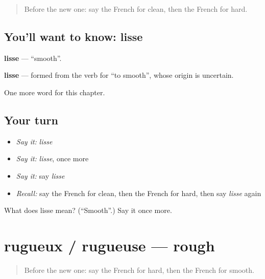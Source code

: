 \label{lesson:FR-C244-lisse}



\begin{quote}
Before the new one: say the French for clean, then the French for hard.
\end{quote}

\subsection*{You'll want to know: lisse}
\textbf{lisse} — \textquotedblleft{}smooth\textquotedblright{}.

\begin{cousinweb}
\textbf{lisse} — formed from the verb for \textquotedblleft{}to smooth\textquotedblright{}, whose origin is uncertain.
\end{cousinweb}

\begin{grammarlens}[title={What you've built}]
One more word for this chapter.
\end{grammarlens}

\subsection*{Your turn}
\begin{itemize}
\raggedright
  \item \emph{Say it:} \emph{lisse}
  \item \emph{Say it:} \emph{lisse}, once more
  \item \emph{Say it:} say \emph{lisse}
  \item \emph{Recall:} say the French for clean, then the French for hard, then say \emph{lisse} again
\end{itemize}

\begin{tcolorbox}[breakable,colback=teal!4,colframe=teal!35!black,title={Before you move on}]
What does lisse mean? (\textquotedblleft{}Smooth\textquotedblright{}.) Say it once more.
\end{tcolorbox}
\section[rugueux / rugueuse]{rugueux / rugueuse — rough}

\label{lesson:FR-C244-rugueux-rugueuse}



\begin{quote}
Before the new one: say the French for hard, then the French for smooth.
\end{quote}

